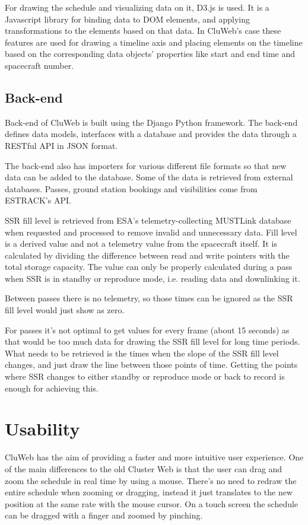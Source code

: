 For drawing the schedule and visualizing data on it, D3.js is used. It is a Javascript library for binding data to DOM elements, and applying transformations to the elements based on that data. In CluWeb's case these features are used for drawing a timeline axis and placing elements on the timeline based on the corresponding data objects' properties like start and end time and spacecraft number.

\subsection{Back-end}
Back-end of CluWeb is built using the Django Python framework. The back-end defines data models, interfaces with a database and provides the data through a RESTful API in JSON format.

The back-end also has importers for various different file formats so that new data can be added to the database. Some of the data is retrieved from external databases. Passes, ground station bookings and visibilities come from ESTRACK's API.

SSR fill level is retrieved from ESA's telemetry-collecting MUSTLink database when requested and processed to remove invalid and unnecessary data. Fill level is a derived value and not a telemetry value from the spacecraft itself. It is calculated by dividing the difference between read and write pointers with the total storage capacity. The value can only be properly calculated during a pass when SSR is in standby or reproduce mode, i.e. reading data and downlinking it. 

Between passes there is no telemetry, so those times can be ignored as the SSR fill level would just show as zero.

For passes it's not optimal to get values for every frame (about 15 seconds) as that would be too much data for drawing the SSR fill level for long time periods. What needs to be retrieved is the times when the slope of the SSR fill level changes, and just draw the line between those points of time. Getting the points where SSR changes to either standby or reproduce mode or back to record is enough for achieving this.

\section{Usability}
CluWeb has the aim of providing a faster and more intuitive user experience. One of the main differences to the old Cluster Web is that the user can drag and zoom the schedule in real time by using a mouse. There's no need to redraw the entire schedule when zooming or dragging, instead it just translates to the new position at the same rate with the mouse cursor. On a touch screen the schedule can be dragged with a finger and zoomed by pinching.

